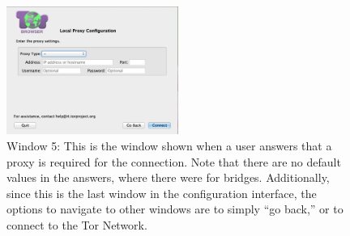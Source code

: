 \documentclass{template}
\begin{document}
\begin{figure}[h]
\label{fig:window5}
  \centering
    \includegraphics[width=0.5\textwidth]{window5.png}
    \caption{Window 5: This is the window shown when a user answers that a proxy is 
    required for the connection. Note that there are no default values in the answers, 
    where there were for bridges. Additionally, since this is the last window in the configuration
    interface, the options to navigate to other windows are to simply ``go back,'' or to 
    connect to the Tor Network.}
\end{figure}
\end{document}
